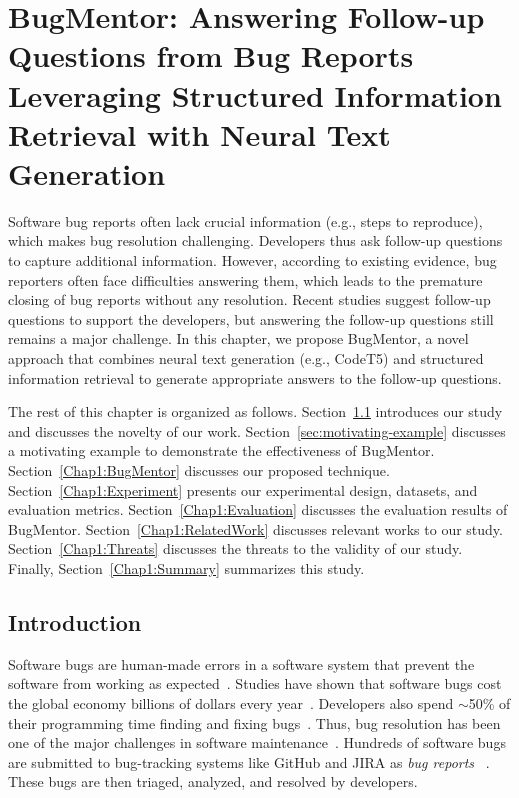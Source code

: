 \chapter{BugMentor: Answering Follow-up Questions from Bug Reports Leveraging Structured Information Retrieval with Neural Text Generation}\label{chapter:BugMentor}


Software bug reports often lack crucial information (e.g., steps to reproduce), which makes bug resolution challenging. Developers thus ask follow-up questions to capture additional information. However, according to existing evidence, bug reporters often face difficulties answering them, which leads to the premature closing of bug reports without any resolution. Recent studies suggest follow-up questions to support the developers, but answering the follow-up questions still remains a major challenge. In this chapter, we propose BugMentor, a novel approach that combines neural text generation (e.g., CodeT5) and structured information retrieval to generate appropriate answers to the follow-up questions. 

The rest of this chapter is organized as follows. Section~\ref{Chap1:Intro} introduces our study and discusses the novelty of our work. Section~\ref{sec:motivating-example} discusses a motivating example to demonstrate the effectiveness of BugMentor. Section~\ref{Chap1:BugMentor} discusses our proposed technique. Section~\ref{Chap1:Experiment} presents our experimental design, datasets, and evaluation metrics. Section~\ref{Chap1:Evaluation} discusses the evaluation results of BugMentor. Section~\ref{Chap1:RelatedWork} discusses relevant works to our study. Section~\ref{Chap1:Threats} discusses the threats to the validity of our study. Finally, Section~\ref{Chap1:Summary} summarizes this study.

\section{Introduction} \label{Chap1:Intro}

Software bugs are human-made errors in a software system that prevent the software from working as expected~\cite{ieeestandardglossaryforse}. Studies have shown that software bugs cost the global economy billions of dollars every year~\cite{britton2013reversible, zou2018practitioners}. Developers also spend $\sim$50\% of their programming time finding and fixing bugs~\cite{britton2013reversible}. Thus, bug resolution has been one of the major challenges in software maintenance~\cite{zou2018practitioners}. Hundreds of software bugs are submitted to bug-tracking systems like GitHub and JIRA as \textit{bug reports} ~\cite{anvik2006should}. These bugs are then triaged, analyzed, and resolved by developers.\par



